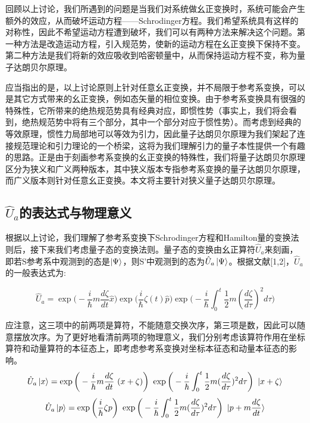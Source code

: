 \documentclass[a4paper]{article}
\begin{document}
        回顾以上讨论，我们所遇到的问题是当我们对系统做幺正变换时，系统可能会产生额外的效应，从而破坏运动方程——Schrodinger方程。我们希望系统具有这样的对称性，因此不希望运动方程遭到破坏，我们可以有两种方法来解决这个问题。第一种方法是改造运动方程，引入规范势，使新的运动方程在幺正变换下保持不变。第二种方法是我们将新的效应吸收到哈密顿量中，从而保持运动方程不变，称为量子达朗贝尔原理。

        应当指出的是，以上讨论原则上针对任意幺正变换，并不局限于参考系变换，可以是其它方式带来的幺正变换，例如态矢量的相位变换。由于参考系变换具有很强的特殊性，它所带来的绝热规范势具有经典对应，即惯性势（事实上，我们将会看到，绝热规范势中将有三个部分，其中一个部分对应于惯性势）。而考虑到经典的等效原理，惯性力局部地可以等效为引力，因此量子达朗贝尔原理为我们架起了连接规范理论和引力理论的一个桥梁，这将为我们理解引力的量子本性提供一个有趣的思路。正是由于刻画参考系变换的幺正变换的特殊性，我们将量子达朗贝尔原理区分为狭义和广义两种版本，其中狭义版本专指参考系变换的量子达朗贝尔原理，而广义版本则针对任意幺正变换。本文将主要针对狭义量子达朗贝尔原理。

    \subsection{$\hat{U}_a$的表达式与物理意义}

        根据以上讨论，我们理解了参考系变换下Schrodinger方程和Hamilton量的变换法则后，接下来我们考虑量子态的变换法则。量子态的变换由幺正算符$\hat{U}_a$来刻画，即若S参考系中观测到的态是$\ket{\Psi}$，则S’中观测到的态为$\hat{U}_a\ket{\Psi}$。根据文献[1,2]，$\hat{U}_a$的一般表达式为:
    
        \begin{equation}
            \hat{U}_a=\exp\bigg(-\frac{i}{\hbar} m \frac{d \zeta}{dt} \hat{x}\bigg) \exp\bigg({\frac{i}{\hbar}\zeta(t) \hat{p}}\bigg) \exp\bigg(-\frac{i}{\hbar}\int_0^t\frac{1}{2}m(\frac{d \zeta}{d\tau})^2 d\tau\bigg)
        \end{equation}
        
        应注意，这三项中的前两项是算符，不能随意交换次序，第三项是数，因此可以随意摆放次序。为了更好地看清前两项的物理意义，我们分别考虑该算符作用在坐标算符和动量算符的本征态上，即考虑参考系变换对坐标本征态和动量本征态的影响。
        \begin{equation}
            \hat{U}_a \ket{x} = \exp\bigg(-\frac{i}{\hbar}m\frac{d \zeta}{dt}\ (x+\zeta)\bigg)\ \exp\bigg(-\frac{i}{\hbar}\int_0^t\frac{1}{2}m(\frac{d \zeta}{d\tau})^2 d\tau \bigg)\ \ket{x+\zeta}
        \end{equation}
        \begin{equation}
            \hat{U}_a \ket{p} = \exp\bigg(\frac{i}{\hbar}\zeta p \bigg)\ \exp\bigg(-\frac{i}{\hbar}\int_0^t\frac{1}{2}m(\frac{d \zeta}{d\tau})^2 d\tau \bigg)\ \ket{p+m\frac{d \zeta}{dt}}
        \end{equation}
\end{document}
